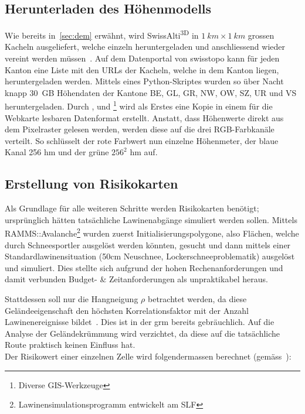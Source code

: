 \subsection{Herunterladen des Höhenmodells}

Wie bereits in\ \ref{sec:dem} erwähnt, wird SwissAlti\textsuperscript{3D} in $\qty{1}{km} \times \qty{1}{km}$ grossen Kacheln ausgeliefert, welche einzeln heruntergeladen und anschliessend wieder vereint werden müssen~\cite{alti3dprod}. Auf dem Datenportal von swisstopo kann für jeden Kanton eine Liste mit den URLs der Kacheln, welche in dem Kanton liegen, heruntergeladen werden. Mittels eines Python-Skriptes wurden so über Nacht knapp \qty{30}{GB} Höhendaten der Kantone BE, GL, GR, NW, OW, SZ, UR und VS heruntergeladen. Durch ,  und \footnote{Diverse GIS-Werkzeuge} wird als Erstes eine Kopie in einem für die Webkarte lesbaren Datenformat erstellt. Anstatt, dass Höhenwerte direkt aus dem Pixelraster gelesen werden, werden diese auf die drei RGB-Farbkanäle verteilt. So schlüsselt der rote Farbwert nun einzelne Höhenmeter, der blaue Kanal 256 hm und der grüne $256^2$ hm auf.

\subsection{Erstellung von Risikokarten}

Als Grundlage für alle weiteren Schritte werden Risikokarten benötigt; ursprünglich hätten tatsächliche Lawinenabgänge simuliert werden sollen. Mittels RAMMS::Avalanche\footnote{Lawinensimulationsprogramm entwickelt am SLF} wurden zuerst Initialisierungspolygone, also Flächen, welche durch Schneesportler ausgelöst werden könnten, gesucht und dann mittels einer Standardlawinensituation (50cm Neuschnee, Lockerschneeproblematik) ausgelöst und simuliert. Dies stellte sich aufgrund der hohen Rechenanforderungen und damit verbunden Budget- \& Zeitanforderungen als unpraktikabel heraus.

Stattdessen soll nur die Hangneigung $\rho$ betrachtet werden, da diese Geländeeigenschaft den höchsten Korrelationsfaktor mit der Anzahl Lawinenereignisse bildet~\cite{arpddatasetdocs}. Dies ist in der \gls{grm} bereits gebräuchlich. Auf die Analyse der Geländekrümmung wird verzichtet, da diese auf die tatsächliche Route praktisch keinen Einfluss hat.\\
Der Risikowert einer einzelnen Zelle wird folgendermassen berechnet (gemäss~\citeauthor{sacbergspwinterp99})\cite{sacbergspwinterp99}:

